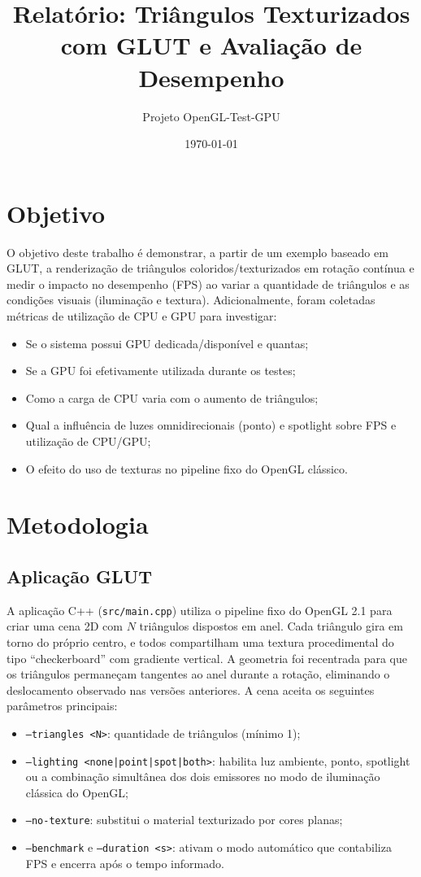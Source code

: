 \documentclass[11pt,a4paper]{article}
\title{Relatório: Triângulos Texturizados com GLUT e Avaliação de Desempenho}
\author{Projeto OpenGL-Test-GPU}
\date{\today}
\begin{document}
\maketitle

\section{Objetivo}
O objetivo deste trabalho é demonstrar, a partir de um exemplo baseado em GLUT, a
renderização de triângulos coloridos/texturizados em rotação contínua e medir o
impacto no desempenho (FPS) ao variar a quantidade de triângulos e as condições
visuais (iluminação e textura). Adicionalmente, foram coletadas métricas de
utilização de CPU e GPU para investigar:

\begin{itemize}
  \item Se o sistema possui GPU dedicada/disponível e quantas;
  \item Se a GPU foi efetivamente utilizada durante os testes;
  \item Como a carga de CPU varia com o aumento de triângulos;
  \item Qual a influência de luzes omnidirecionais (ponto) e spotlight sobre FPS
        e utilização de CPU/GPU;
  \item O efeito do uso de texturas no pipeline fixo do OpenGL clássico.
\end{itemize}

\section{Metodologia}
\subsection{Aplicação GLUT}
A aplicação C++ (\texttt{src/main.cpp}) utiliza o pipeline fixo do OpenGL 2.1
para criar uma cena 2D com $N$ triângulos dispostos em anel. Cada triângulo gira
em torno do próprio centro, e todos compartilham uma textura procedimental do
tipo ``checkerboard'' com gradiente vertical. A geometria foi recentrada para que
os triângulos permaneçam tangentes ao anel durante a rotação, eliminando o
deslocamento observado nas versões anteriores. A cena aceita os seguintes
parâmetros principais:

\begin{itemize}
  \item \texttt{--triangles <N>}: quantidade de triângulos (mínimo 1);
  \item \texttt{--lighting <none|point|spot|both>}: habilita luz ambiente, ponto,
        spotlight ou a combinação simultânea dos dois emissores no modo de
        iluminação clássica do OpenGL;
  \item \texttt{--no-texture}: substitui o material texturizado por cores planas;
  \item \texttt{--benchmark} e \texttt{--duration <s>}: ativam o modo automático
        que contabiliza FPS e encerra após o tempo informado.
\end{itemize}
\end{document}
